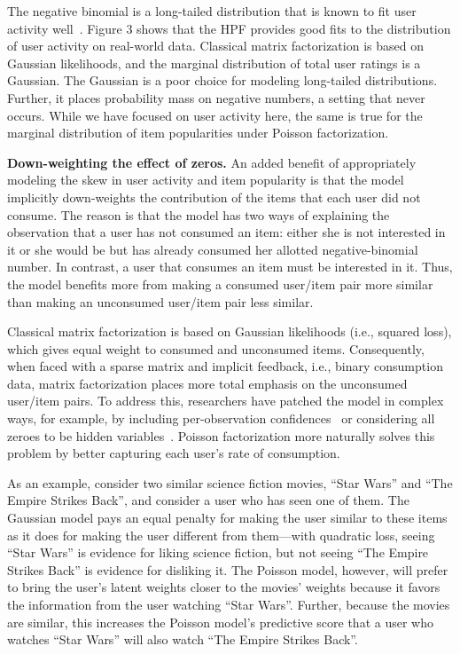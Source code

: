 The negative binomial is a long-tailed distribution that is known to
fit user activity well~\cite{Goodhardt:1984,Dunning:1993}.  Figure 3
shows that the HPF provides good fits to the distribution of user
activity on real-world data.  Classical matrix factorization is based
on Gaussian likelihoods, and the marginal distribution of total user
ratings is a Gaussian.  The Gaussian is a poor choice for modeling
long-tailed distributions. Further, it places probability mass on
negative numbers, a setting that never occurs. While we have focused
on user activity here, the same is true for the marginal distribution
of item popularities under Poisson factorization.

{\bf Down-weighting the effect of zeros.}
An added benefit of appropriately modeling the skew in user activity
and item popularity is that the model implicitly down-weights the
contribution of the items that each user did not consume. The reason
is that the model has two ways of explaining the observation that a
user has not consumed an item: either she is not interested in it or
she would be but has already consumed her allotted negative-binomial
number.  In contrast, a user that consumes an item must be interested
in it.  Thus, the model benefits more from making a consumed user/item
pair more similar than making an unconsumed user/item pair less
similar.

Classical matrix factorization is based on Gaussian likelihoods (i.e.,
squared loss), which gives equal weight to consumed and unconsumed
items.  Consequently, when faced with a sparse matrix and implicit
feedback, i.e., binary consumption data, matrix factorization places
more total emphasis on the unconsumed user/item pairs.  To address
this, researchers have patched the model in complex ways, for example,
by including per-observation confidences~\cite{Koren:2009} or
considering all zeroes to be hidden variables~\cite{Paquet:2013p9197}.
Poisson factorization more naturally solves this problem by better
capturing each user's rate of consumption.

As an example, consider two similar science fiction movies, ``Star
Wars'' and ``The Empire Strikes Back'', and consider a user who has
seen one of them.  The Gaussian model pays an equal penalty for making
the user similar to these items as it does for making the user
different from them---with quadratic loss, seeing ``Star Wars'' is
evidence for liking science fiction, but not seeing ``The Empire
Strikes Back'' is evidence for disliking it.  The Poisson model,
however, will prefer to bring the user's latent weights closer to the
movies' weights because it favors the information from the user
watching ``Star Wars''. Further, because the movies are similar, this
increases the Poisson model's predictive score that a user who watches
``Star Wars'' will also watch ``The Empire Strikes Back''.

